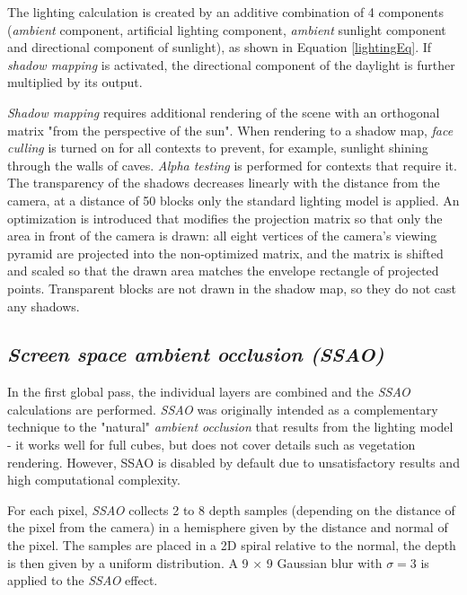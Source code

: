 
The lighting calculation is created by an additive combination of 4 components (\textit{ambient} component, artificial lighting component, \textit{ambient} sunlight component and directional component of sunlight), as shown in Equation \ref{lightingEq}. If \textit{shadow mapping} is activated, the directional component of the daylight is further multiplied by its output.

\textit{Shadow mapping} requires additional rendering of the scene with an orthogonal matrix "from the perspective of the sun". When rendering to a shadow map, \textit{face culling} is turned on for all contexts to prevent, for example, sunlight shining through the walls of caves. \textit{Alpha testing} is performed for contexts that require it. The transparency of the shadows decreases linearly with the distance from the camera, at a distance of 50 blocks only the standard lighting model is applied. An optimization is introduced that modifies the projection matrix so that only the area in front of the camera is drawn: all eight vertices of the camera's viewing pyramid are projected into the non-optimized matrix, and the matrix is ​​shifted and scaled so that the drawn area matches the envelope rectangle of projected points. Transparent blocks are not drawn in the shadow map, so they do not cast any shadows.

\subsection{\textit{Screen space ambient occlusion (SSAO)}}
In the first global pass, the individual layers are combined and the \textit{SSAO} calculations are performed. \textit{SSAO} was originally intended as a complementary technique to the "natural" \textit{ambient occlusion} that results from the lighting model - it works well for full cubes, but does not cover details such as vegetation rendering. However, SSAO is disabled by default due to unsatisfactory results and high computational complexity.

For each pixel, \textit{SSAO} collects 2 to 8 depth samples (depending on the distance of the pixel from the camera) in a hemisphere given by the distance and normal of the pixel. The samples are placed in a 2D spiral relative to the normal, the depth is then given by a uniform distribution. A 9 × 9 Gaussian blur with $\sigma = 3$ is applied to the \textit{SSAO} effect.

